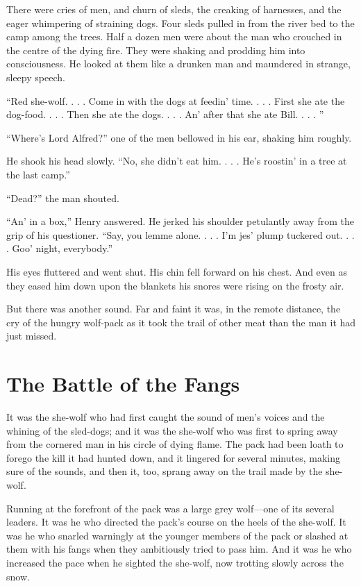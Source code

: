 \documentclass[10pt]{book}
\begin{document}
There were cries of men, and churn of sleds, the creaking of harnesses,
and the eager whimpering of straining dogs. Four sleds pulled in from
the river bed to the camp among the trees. Half a dozen men were about
the man who crouched in the centre of the dying fire. They were shaking
and prodding him into consciousness. He looked at them like a drunken
man and maundered in strange, sleepy speech.

“Red she-wolf. . . . Come in with the dogs at feedin’ time. . . . First
she ate the dog-food. . . . Then she ate the dogs. . . . An’ after that
she ate Bill. . . . ”

“Where’s Lord Alfred?” one of the men bellowed in his ear, shaking him
roughly.

He shook his head slowly. “No, she didn’t eat him. . . . He’s roostin’
in a tree at the last camp.”

“Dead?” the man shouted.

“An’ in a box,” Henry answered. He jerked his shoulder petulantly away
from the grip of his questioner. “Say, you lemme alone. . . . I’m jes’
plump tuckered out. . . . Goo’ night, everybody.”

His eyes fluttered and went shut. His chin fell forward on his chest.
And even as they eased him down upon the blankets his snores were
rising on the frosty air.

But there was another sound. Far and faint it was, in the remote
distance, the cry of the hungry wolf-pack as it took the trail of other
meat than the man it had just missed.

\chapter{The Battle of the Fangs}

It was the she-wolf who had first caught the sound of men’s voices and
the whining of the sled-dogs; and it was the she-wolf who was first to
spring away from the cornered man in his circle of dying flame. The
pack had been loath to forego the kill it had hunted down, and it
lingered for several minutes, making sure of the sounds, and then it,
too, sprang away on the trail made by the she-wolf.

Running at the forefront of the pack was a large grey wolf—one of its
several leaders. It was he who directed the pack’s course on the heels
of the she-wolf. It was he who snarled warningly at the younger members
of the pack or slashed at them with his fangs when they ambitiously
tried to pass him. And it was he who increased the pace when he sighted
the she-wolf, now trotting slowly across the snow.
\end{document}
